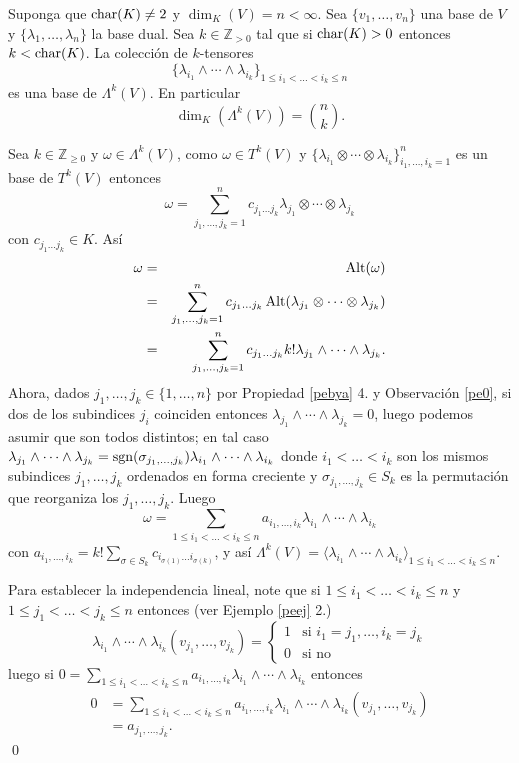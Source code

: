 \begin{teo}
Suponga que $\operatorname{char}(K)\ne 2$ y $\dim_K(V)=n<\infty$. Sea $\{v_1,\ldots,v_n\}$ una base de $V$ y $\{\lambda_1,\ldots,\lambda_n\}$ la base dual. Sea $k\in\mathbb{Z}_{>0}$ tal que si $\operatorname{char}(K)>0$ entonces $k<\operatorname{char}(K)$. La colecci\'on de $k$-tensores
$$\Big\{\lambda_{i_1}\wedge\cdots\wedge\lambda_{i_k}\Big\}_{1\le i_1<\ldots<i_k\le n}$$
es una base de $\Lambda^k(V)$. En particular $$\dim_K\left(\Lambda^k(V)\right)=\binom{n}{k}.$$
\end{teo}

\dem Sea $k\in\mathbb{Z}_{\ge 0}$ y $\omega\in\Lambda^k(V)$, como $\omega\in T^k(V)$ y $\big\{\lambda_{i_1}\otimes\cdots\otimes\lambda_{i_k}\big\}_{i_1,\ldots,i_k=1}^n$ es un base de $T^k(V)$ entonces
$$\omega=\sum_{j_1,\ldots,j_k=1}^n c_{j_1\ldots j_k}\lambda_{j_1}\otimes\cdots\otimes\lambda_{j_k}$$
con $c_{j_1\ldots j_k}\in K$. As\'i
\begin{eqnarray*}
\omega & = & \operatorname{Alt}(\omega)\\
 & = & \sum_{j_1,\ldots,j_k=1}^n c_{j_1\ldots j_k}\operatorname{Alt}(\lambda_{j_1}\otimes\cdots\otimes\lambda_{j_k})\\
 & = & \sum_{j_1,\ldots,j_k=1}^n c_{j_1\ldots j_k}k!\lambda_{j_1}\wedge\cdots\wedge\lambda_{j_k}.\\
\end{eqnarray*}
Ahora, dados $j_1,\ldots,j_k\in\{1,\ldots,n\}$ por Propiedad \ref{pebya} 4. y Observaci\'on \ref{pe0}, si dos de los subindices $j_i$ coinciden entonces $\lambda_{j_1}\wedge\cdots\wedge\lambda_{j_k}=0$, luego podemos asumir que son todos distintos; en tal caso $\lambda_{j_1}\wedge\cdots\wedge\lambda_{j_k}=\operatorname{sgn}(\sigma_{j_1,\ldots,j_k})\lambda_{i_1}\wedge\cdots\wedge\lambda_{i_k}$ donde $i_1<\ldots<i_k$ son los mismos subindices $j_1,\ldots,j_k$ ordenados en forma creciente y $\sigma_{j_1,\ldots,j_k}\in S_k$ es la permutaci\'on que reorganiza los $j_1,\ldots,j_k$.
Luego
$$\omega=\sum_{1\le i_1<\ldots<i_k\le n} a_{i_1,\ldots,i_k}\lambda_{i_1}\wedge\cdots\wedge\lambda_{i_k}$$
con $a_{i_1,\ldots,i_k}=k!\sum_{\sigma\in S_k}c_{i_{\sigma(1)}\ldots i_{\sigma(k)}}$, y as\'i  $\Lambda^k(V)=\langle \lambda_{i_1}\wedge\cdots\wedge\lambda_{i_k} \rangle_{1\le i_1<\ldots<i_k\le n}$.

Para establecer la independencia lineal, note que si $1\le i_1<\ldots<i_k\le n$ y $1\le j_1<\ldots<j_k\le n$ entonces (ver Ejemplo \ref{peej} 2.)
$$\lambda_{i_1}\wedge\cdots\wedge\lambda_{i_k}(v_{j_1},\ldots,v_{j_k})=\left\{\begin{array}{rl}
1 & \text{si } i_1=j_1,\ldots, i_k=j_k \\
0 & \text{si no}
\end{array}\right. $$
luego si $0=\sum_{1\le i_1<\ldots<i_k\le n} a_{i_1,\ldots,i_k}\lambda_{i_1}\wedge\cdots\wedge\lambda_{i_k}$ entonces
\begin{align*}
0 &=\sum_{1\le i_1<\ldots<i_k\le n} a_{i_1,\ldots,i_k}\lambda_{i_1}\wedge\cdots\wedge\lambda_{i_k}(v_{j_1},\ldots,v_{j_k})\\
 &=a_{j_1,\ldots,j_k}.
\end{align*}\qed

